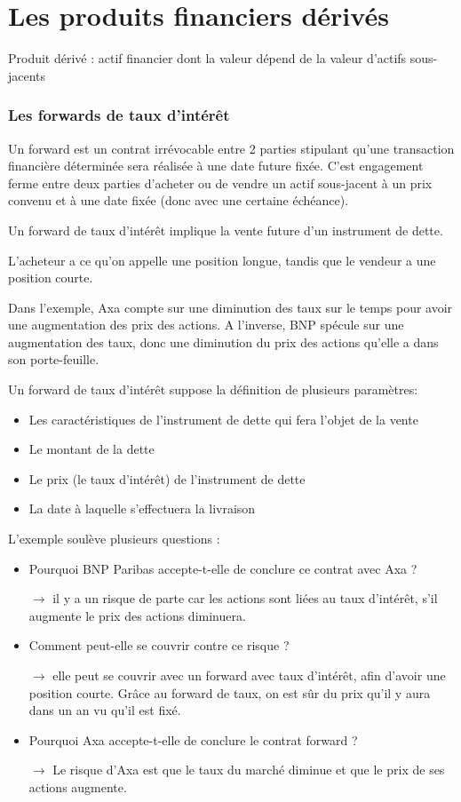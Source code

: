 \part{Les produits financiers dérivés}

Produit dérivé : actif financier dont la valeur dépend de la valeur d'actifs sous-jacents

\section{Les forwards de taux d'intérêt}

Un forward est un contrat irrévocable entre 2 parties stipulant qu'une transaction financière déterminée sera réalisée à une date future fixée. C'est engagement ferme entre deux parties d'acheter ou de vendre un actif sous-jacent à un prix convenu et à une date fixée (donc avec une certaine échéance).

Un forward de taux d'intérêt implique la vente future d'un instrument de dette.

L'acheteur a ce qu'on appelle une position longue, tandis que le vendeur a une position courte.

Dans l'exemple, Axa compte sur une diminution des taux sur le temps pour avoir une augmentation des prix des actions. A l'inverse, BNP spécule sur une augmentation des taux, donc une diminution du prix des actions qu'elle a dans son porte-feuille.

Un forward de taux d'intérêt suppose la définition de plusieurs paramètres: 
\begin{itemize}
	\item Les caractéristiques de l'instrument de dette qui fera l'objet de la vente 
	\item Le montant de la dette 
	\item Le prix (le taux d'intérêt) de l'instrument de dette 
	\item La date à laquelle s'effectuera la livraison
\end{itemize}

L'exemple soulève plusieurs questions :

\begin{itemize}
	\item Pourquoi BNP Paribas accepte-t-elle de conclure ce contrat avec Axa ? 
	\item[$\rightarrow$] il y a un risque de parte car les actions sont liées au taux d'intérêt, s'il augmente le prix des actions diminuera.
	\item Comment peut-elle se couvrir contre ce risque ?
	\item[$\rightarrow$] elle peut se couvrir avec un forward avec taux d'intérêt, afin d'avoir une position courte. Grâce au forward de taux, on est sûr du prix qu'il y aura dans un an vu qu'il est fixé.
	\item Pourquoi Axa accepte-t-elle de conclure le contrat forward ?
	\item[$\rightarrow$] Le risque d'Axa est que le taux du marché diminue et que le prix de ses actions augmente.
\end{itemize}


